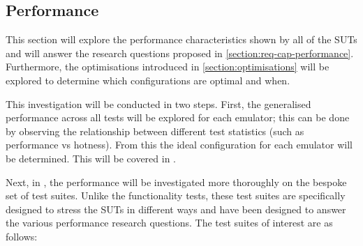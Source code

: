 \subsection{Performance}

This section will explore the performance characteristics shown by all of the SUTs and will answer the research questions proposed in \autoref{section:req-cap-performance}. Furthermore, the optimisations introduced in \autoref{section:optimisations} will be explored to determine which configurations are optimal and when.

This investigation will be conducted in two steps. First, the generalised performance across all tests will be explored for each emulator; this can be done by observing the relationship between different test statistics (such as performance vs hotness). From this the ideal configuration for each emulator will be determined. This will be covered in .

Next, in , the performance will be investigated more thoroughly on the bespoke set of test suites. Unlike the functionality tests, these test suites are specifically designed to stress the SUTs in different ways and have been designed to answer the various performance research questions. The test suites of interest are as follows:

